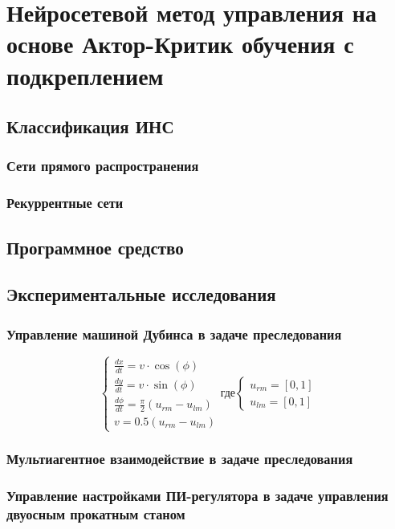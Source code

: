 \chapter{Нейросетевой метод управления на основе Актор-Критик обучения с подкреплением} \label{chapt3}

\section{Классификация ИНС} \label{sect3_1}

\subsection{Сети прямого распространения} \label{subsect3_1_1}

\subsection{Рекуррентные сети} \label{subsect3_1_2}

\section{Программное средство} \label{sect3_2}

\section{Экспериментальные исследования} \label{sect3_3}

\subsection{Управление машиной Дубинса в задаче преследования} \label{subsect3_3_1}

\begin{equation}
\label{eq:3_3_1p1}
\left\{
\begin{alignedat}{2}
\frac{dx}{dt}=v\cdot \cos (\phi ) \\
\frac{dy}{dt}=v\cdot \sin (\phi ) \\
\frac{d\phi}{dt}=\frac{\pi}{2}(u_{rm}-u_{lm}) \\
v=0.5(u_{rm}-u_{lm})
\end{alignedat}
\right.
\text{где}
\left\{
\begin{alignedat}{2}
u_{rm}=[0,1]\\
u_{lm}=[0,1]
\end{alignedat}
\right.
\end{equation}

\subsection{Мультиагентное взаимодействие в задаче преследования} \label{subsect3_3_2}

\subsection{Управление настройками ПИ-регулятора в задаче управления двуосным прокатным станом} \label{subsect3_3_3}

\clearpage
\clearpage
